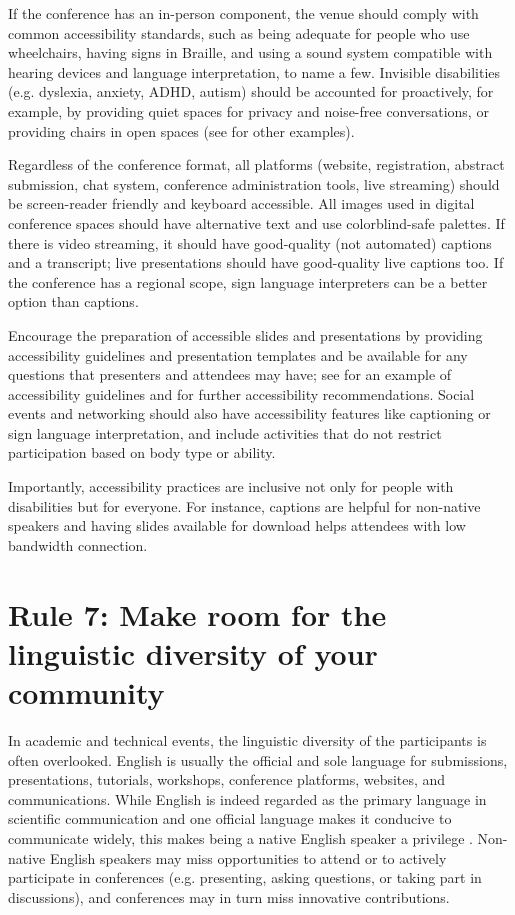\documentclass[10pt,letterpaper]{article}
\begin{document}
If the conference has an in-person component, the venue should comply with common accessibility standards, such as being adequate for people who use wheelchairs, having signs in Braille, and using a sound system compatible with hearing devices and language interpretation, to name a few. 
Invisible disabilities (e.g. dyslexia, anxiety, ADHD, autism) should be accounted for proactively, for example, by providing quiet spaces for privacy and noise-free conversations, or providing chairs in open spaces (see \cite{pun_dos_2016} for other examples).

Regardless of the conference format, all platforms (website, registration, abstract submission, chat system, conference administration tools, live streaming) should be screen-reader friendly and keyboard accessible.
All images used in digital conference spaces should have alternative text and use colorblind-safe palettes.
If there is video streaming, it should have good-quality (not automated) captions and a transcript; live presentations should have good-quality live captions too.
If the conference has a regional scope, sign language interpreters can be a better option than captions.

Encourage the preparation of accessible slides and presentations by providing accessibility guidelines and presentation templates and be available for any questions that presenters and attendees may have; see \cite{sanchez-tapia_user_2021} for an example of accessibility guidelines and \cite{chavez_preparing_2021, sanchez-tapia_making_2021, joo_how_2021} for further accessibility recommendations.
Social events and networking should also have accessibility features like captioning or sign language interpretation, and include activities that do not restrict participation based on body type or ability.

Importantly, accessibility practices are inclusive not only for people with disabilities but for everyone.
For instance, captions are helpful for non-native speakers and having slides available for download helps attendees with low bandwidth connection. 


\section*{Rule 7: Make room for the linguistic diversity of your community}
\label{rule_language}

In academic and technical events, the linguistic diversity of the participants is often overlooked. 
English is usually the official and sole language for submissions, presentations, tutorials, workshops, conference platforms, websites, and communications. 
While English is indeed regarded as the primary language in scientific communication and one official language makes it conducive to communicate widely, this makes being a native English speaker a privilege \cite{amanoTenTipsOvercoming2021}. 
Non-native English speakers may miss opportunities to attend or to actively participate in conferences (e.g. presenting, asking questions, or taking part in discussions),
and conferences may in turn miss innovative contributions.
\end{document}
